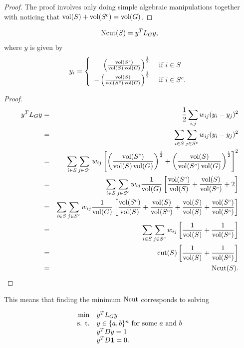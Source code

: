 \begin{proof}
The proof involves only doing simple algebraic manipulations together with noticing that $\operatorname{vol}(S)+\operatorname{vol}(S^c) = \operatorname{vol}(G)$.
\end{proof}

\begin{proposition}
\[
\operatorname{Ncut}(S) = y^TL_Gy,
\]
where $y$ is given by
\[
y_i = \left\{ \begin{array}{rl}  \left(  \frac{\operatorname{vol}(S^c)}{\operatorname{vol}(S)\operatorname{vol}(G)}\right)^{\frac12} & \text{ if } i\in S \\
  -  \left(  \frac{\operatorname{vol}(S)}{\operatorname{vol}(S^c)\operatorname{vol}(G)}\right)^{\frac12}  & \text{ if } i\in S^c.     \end{array}   \right.
\]
\end{proposition}

\begin{proof}
\begin{eqnarray*}
y^TL_Gy & = & \frac12 \sum_{i,j} w_{ij} (y_i - y_j)^2 \\
& = & \sum_{i\in S} \sum_{j\in S^c} w_{ij} (y_i - y_j)^2 \\
& = & \sum_{i\in S} \sum_{j\in S^c} w_{ij} \left[   \left(  \frac{\operatorname{vol}(S^c)}{\operatorname{vol}(S)\operatorname{vol}(G)}\right)^{\frac12}  + \left(  \frac{\operatorname{vol}(S)}{\operatorname{vol}(S^c)\operatorname{vol}(G)}\right)^{\frac12}    \right]^2 \\
& = & \sum_{i\in S} \sum_{j\in S^c} w_{ij}\frac{1}{\operatorname{vol}(G)} \left[ \frac{\operatorname{vol}(S^c)}{\operatorname{vol}(S)} + \frac{\operatorname{vol}(S)}{\operatorname{vol}(S^c)} + 2   \right] \\
& = & \sum_{i\in S} \sum_{j\in S^c}w_{ij} \frac{1}{\operatorname{vol}(G)} \left[ \frac{\operatorname{vol}(S^c)}{\operatorname{vol}(S)} + \frac{\operatorname{vol}(S)}{\operatorname{vol}(S^c)} +  \frac{\operatorname{vol}(S)}{\operatorname{vol}(S)} + \frac{\operatorname{vol}(S^c)}{\operatorname{vol}(S^c)}  \right] \\
& = & \sum_{i\in S} \sum_{j\in S^c}w_{ij}  \left[ \frac{1}{\operatorname{vol}(S)} + \frac{1}{\operatorname{vol}(S^c)}  \right] \\
& = & \operatorname{cut}(S)  \left[ \frac{1}{\operatorname{vol}(S)} + \frac{1}{\operatorname{vol}(S^c)}  \right]\\
& = & \operatorname{Ncut}(S).
\end{eqnarray*}
\end{proof}

This means that finding the minimum $\operatorname{Ncut}$ corresponds to solving

\begin{equation}\label{eq:3:Ncut:norelax}
\begin{array}{rl}
\min & y^TL_Gy \\
\text{s. t.} & y\in \{a,b\}^n \text{ for some } a \text{ and } b \\
 & y^TDy = 1 \\
 & y^TD\mathbf{1} = 0.
\end{array}
\end{equation}

